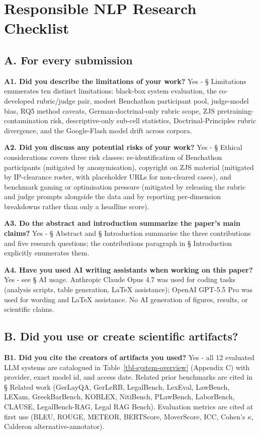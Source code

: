 \documentclass[11pt]{article}
\begin{document}
\section{Responsible NLP Research
Checklist}\label{responsible-nlp-research-checklist}

\subsection{A. For every submission}\label{a.-for-every-submission}

\textbf{A1. Did you describe the limitations of your work?} Yes - §
Limitations enumerates ten distinct limitations: black-box system
evaluation, the co-developed rubric/judge pair, modest Benchathon
participant pool, judge-model bias, RQ5 method caveats,
German-doctrinal-only rubric scope, ZJS pretraining-contamination risk,
descriptive-only sub-cell statistics, Doctrinal-Principles rubric
divergence, and the Google-Flash model drift across corpora.

\textbf{A2. Did you discuss any potential risks of your work?} Yes - §
Ethical considerations covers three risk classes: re-identification of
Benchathon participants (mitigated by anonymisation), copyright on ZJS
material (mitigated by IP-clearance roster, with placeholder URLs for
non-cleared cases), and benchmark gaming or optimisation pressure
(mitigated by releasing the rubric and judge prompts alongside the data
and by reporting per-dimension breakdowns rather than only a headline
score).

\textbf{A3. Do the abstract and introduction summarize the paper's main
claims?} Yes - § Abstract and § Introduction summarise the three
contributions and five research questions; the contributions paragraph
in § Introduction explicitly enumerates them.

\textbf{A4. Have you used AI writing assistants when working on this
paper?} Yes - see § AI usage. Anthropic Claude Opus 4.7 was used for
coding tasks (analysis scripts, table generation, LaTeX assistance);
OpenAI GPT-5.5 Pro was used for wording and LaTeX assistance. No AI
generation of figures, results, or scientific claims.

\subsection{B. Did you use or create scientific
artifacts?}\label{b.-did-you-use-or-create-scientific-artifacts}

\textbf{B1. Did you cite the creators of artifacts you used?} Yes - all
12 evaluated LLM systems are catalogued in
Table~\ref{tbl-system-overview} (Appendix C) with provider, exact model
id, and access date. Related prior benchmarks are cited in § Related
work (GerLayQA, GerLeRB, LegalBench, LexEval, LawBench, LEXam,
GreekBarBench, KOBLEX, NitiBench, PLawBench, LaborBench, CLAUSE,
LegalBench-RAG, Legal RAG Bench). Evaluation metrics are cited at first
use (BLEU, ROUGE, METEOR, BERTScore, MoverScore, ICC, Cohen's
\(\kappa\), Calderon alternative-annotator).
\end{document}
